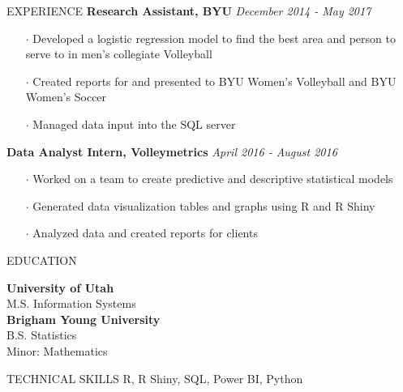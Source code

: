 \documentclass{resume} %
\begin{document}
\begin{rSection}{EXPERIENCE}
    {\bf Research Assistant, BYU} \hfill {\textit{December 2014 - May 2017}}
        \begin{itemize}[noitemsep]
      \item[$\cdot$] Developed a logistic regression model to find the best area and person to serve to in men's collegiate Volleyball
      \item[$\cdot$] Created reports for and presented to BYU Women's Volleyball and BYU Women's Soccer 
      \item[$\cdot$] Managed data input into the SQL server
    \end{itemize}
    {\bf Data Analyst Intern, Volleymetrics} \hfill {\textit{April 2016 - August 2016}}
    \begin{itemize}[noitemsep]
    \item[$\cdot$] Worked on a team to create predictive and descriptive statistical models
    \item[$\cdot$] Generated data visualization tables and graphs using R and R Shiny
    \item[$\cdot$] Analyzed data and created reports for clients
    \end{itemize}
    
     \end{rSection}
      
      \begin{rSection}{EDUCATION}
    
    {\bf University of Utah} 
    \\ M.S. Information Systems\hfill \break
    \\{\bf Brigham Young University} 
    \\ B.S. Statistics
    \\ Minor: Mathematics \hfill \break
    \end{rSection}
    
      
      \begin{rSection}{TECHNICAL SKILLS}
   R, R Shiny, SQL, Power BI, Python
    \end{rSection}

    
\end{document}
